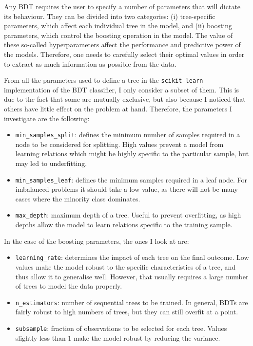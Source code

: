Any BDT requires the user to specify a number of parameters that will dictate its behaviour. They can be divided into two categories: (i) tree-specific parameters, which affect each individual tree in the model, and (ii) boosting parameters, which control the boosting operation in the model. The value of these so-called hyperparameters affect the performance and predictive power of the models. Therefore, one needs to carefully select their optimal values in order to extract as much information as possible from the data.

From all the parameters used to define a tree in the \texttt{scikit-learn} implementation of the BDT classifier, I only consider a subset of them. This is due to the fact that some are mutually exclusive, but also because I noticed that others have little effect on the problem at hand. Therefore, the parameters I investigate are the following:
\begin{itemize}
	\item \texttt{min_samples_split}: defines the minimum number of samples required in a node to be considered for splitting. High values prevent a model from learning relations which might be highly specific to the particular sample, but may led to underfitting.
	\item \texttt{min_samples_leaf}: defines the minimum samples required in a leaf node. For imbalanced problems it should take a low value, as there will not be many cases where the minority class dominates.
	\item \texttt{max_depth}: maximum depth of a tree. Useful to prevent overfitting, as high depths allow the model to learn relations specific to the training sample.
\end{itemize}
In the case of the boosting parameters, the ones I look at are:
\begin{itemize}
	\item \texttt{learning_rate}: determines the impact of each tree on the final outcome. Low values make the model robust to the specific characteristics of a tree, and thus allow it to generalise well. However, that usually requires a large number of trees to model the data properly.
	\item \texttt{n_estimators}: number of sequential trees to be trained. In general, BDTs are fairly robust to high numbers of trees, but they can still overfit at a point.
	\item \texttt{subsample}: fraction of observations to be selected for each tree. Values slightly less than $1$ make the model robust by reducing the variance.
\end{itemize}

